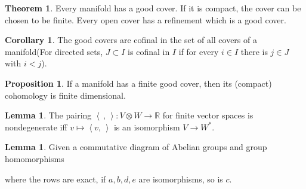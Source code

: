 \documentclass[twocolumn]{article}
\theoremstyle{definition}
\newtheorem{theorem}[definition]{Theorem}
\newtheorem{lemma}[definition]{Lemma}
\newtheorem{proposition}[definition]{Proposition}
\newtheorem{corollary}[definition]{Corollary}
\theoremstyle{remark}
\begin{document}
\begin{theorem}
    Every manifold has a good cover. If it is compact, the cover can be chosen to be finite.
    Every open cover has a refinement which is a good cover.
\end{theorem}
\begin{corollary}
    The good covers are cofinal in the set of all covers of a manifold(For directed sets, $J \subset I$ is cofinal in $I$ if for every $i\in I$ there is $j\in J$ with $i<j$).
\end{corollary}
\begin{proposition}
    If a manifold has a finite good cover, then its (compact) cohomology is finite dimensional.
\end{proposition}
\begin{lemma}
    The pairing $\left\langle \,,\,\right\rangle : V \otimes  W \rightarrow \mathbb{R}$ for finite vector spaces is nondegenerate iff $v \mapsto\left\langle v,\,  \right\rangle$ is an isomorphism $V\rightarrow W^*$.
\end{lemma}
\begin{lemma}
    Given a commutative diagram of Abelian groups and group homomorphisms
    \begin{center}
    \end{center}
    where the rows are exact, if $a, b, d, e$ are isomorphisms, so is $c$.
\end{lemma}
\end{document}
